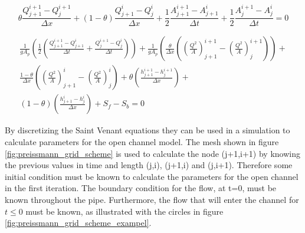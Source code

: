 \begin{equation}\label{eq:continuity_eq_preissmann}
	\theta \frac{Q_{j+1}^{i+1}-Q_j^{i+1}}{\Delta x}+(1-\theta)\frac{Q_{j+1}^i - Q_j^i}{\Delta x}+
	\frac{1}{2}\frac{A_{j+1}^{i+1}-A_{j+1}^i}{\Delta t} + \frac{1}{2} \frac{A_{j}^{i+1} - A_j^i}{\Delta t} = 0
\end{equation}

\begin{multline}
	\frac{1}{gA_p}\left(\frac{1}{2} \left(\frac{Q_{j+1}^{i+1}-Q_{j+1}^i}{\Delta t}+\frac{Q_{j}^{i+1} - Q_j^i}{\Delta t}\right)\right) + \frac{1}{gA_p}\left(\frac{\theta}{\Delta x} \left(\left(\frac{Q^2}{A}\right)_{j+1}^{i+1}-\left(\frac{Q^2}{A}\right)_{j}^{i+1}\right)\right) + \\ \frac{1-\theta}{\Delta x}\left(\left(\frac{Q^2}{A}\right)_{j+1}^{i}-\left(\frac{Q^2}{A}\right)_{j}^{i}\right)+\theta \left(\frac{h_{j+1}^{i+1}-h_j^{i+1}}{\Delta x}\right)+ \\ (1-\theta)\left(\frac{h_{j+1}^{i} - h_j^i}{\Delta x}\right)+S_f-S_b= 0
\end{multline}

By discretizing the Saint Venant equations they can be used in a simulation to calculate parameters for the open channel model. The mesh shown in figure \ref{fig:preissmann_grid_scheme} is used to calculate the node (j+1,i+1) by knowing the previous values in time and length (j,i), (j+1,i) and (j,i+1). Therefore some initial condition must be known to calculate the parameters for the open channel in the first iteration. The boundary condition for the flow, at t=0, must be known throughout the pipe. Furthermore, the flow that will enter the channel for $t\leq 0$ must be known, as illustrated with the circles in figure \ref{fig:preissmann_grid_scheme_exampel}.


